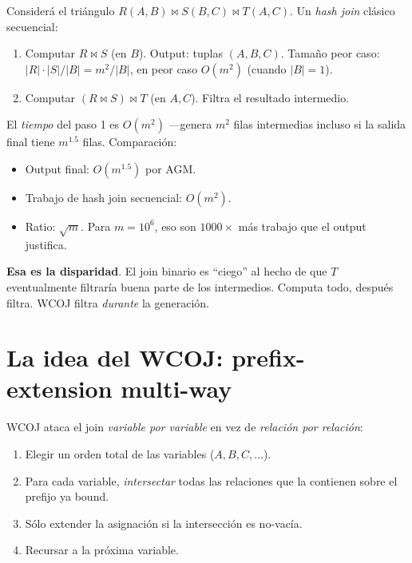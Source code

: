 Considerá el triángulo \(R(A,B) \bowtie S(B,C) \bowtie T(A,C)\).
Un \emph{hash join} clásico secuencial:

\begin{enumerate}
    \item Computar \(R \bowtie S\) (en \(B\)). Output: tuplas
    \((A, B, C)\). Tamaño peor caso: \(|R| \cdot |S|/|B| = m^2 / |B|\),
    en peor caso \(O(m^2)\) (cuando \(|B| = 1\)).
    \item Computar \((R \bowtie S) \bowtie T\) (en \(A, C\)). Filtra
    el resultado intermedio.
\end{enumerate}

\noindent
El \emph{tiempo} del paso 1 es \(O(m^2)\) ---genera \(m^2\) filas
intermedias incluso si la salida final tiene \(m^{1.5}\) filas.
Comparación:

\begin{itemize}
    \item Output final: \(O(m^{1.5})\) por AGM.
    \item Trabajo de hash join secuencial: \(O(m^2)\).
    \item Ratio: \(\sqrt{m}\). Para \(m = 10^6\), eso son
    \(1000\times\) más trabajo que el output justifica.
\end{itemize}

\noindent
\textbf{Esa es la disparidad}. El join binario es ``ciego'' al
hecho de que \(T\) eventualmente filtraría buena parte de los
intermedios. Computa todo, después filtra. WCOJ filtra
\emph{durante} la generación.

\section{La idea del WCOJ: prefix-extension multi-way}

WCOJ ataca el join \emph{variable por variable} en vez de
\emph{relación por relación}:

\begin{enumerate}
    \item Elegir un orden total de las variables (\(A, B, C, \dots\)).
    \item Para cada variable, \emph{intersectar} todas las
    relaciones que la contienen sobre el prefijo ya bound.
    \item Sólo extender la asignación si la intersección es
    no-vacía.
    \item Recursar a la próxima variable.
\end{enumerate}

